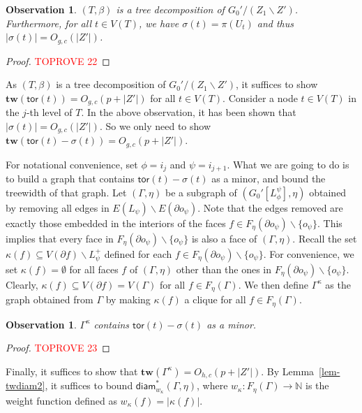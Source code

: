 \documentclass[a4paper,11pt]{article}
\numberwithin{lemma}{section}
\newtheorem{observation}[lemma]{Observation}
\newcommand{\tw}{\mathbf{tw}}
\newcommand{\tor}{\mathsf{tor}}
\begin{document}
\begin{observation} \label{obs-treedecomp}
$(T,\beta)$ is a tree decomposition of $G_0'/(Z_1 \backslash Z')$. Furthermore, for all $t \in V(T)$, we have $\sigma(t) = \pi(U_t)$ and thus $|\sigma(t)| = O_{g,c}(|Z'|)$.
\end{observation}
\begin{proof}\textcolor{red}{TOPROVE 22}\end{proof}

As $(T,\beta)$ is a tree decomposition of $G_0'/(Z_1 \backslash Z')$, it suffices to show $\tw(\tor(t)) = O_{g,c}(p+|Z'|)$ for all $t \in V(T)$.
Consider a node $t \in V(T)$ in the $j$-th level of $T$.
In the above observation, it has been shown that $|\sigma(t)| = O_{g,c}(|Z'|)$.
So we only need to show $\tw(\tor(t) - \sigma(t)) = O_{g,c}(p+|Z'|)$.

For notational convenience, set $\phi = i_j$ and $\psi = i_{j+1}$.
What we are going to do is to build a graph that contains $\tor(t) - \sigma(t)$ as a minor, and bound the treewidth of that graph.
Let $(\varGamma,\eta)$ be a subgraph of $(G_0'[L_\phi^\psi],\eta)$ obtained by removing all edges in $E(L_\psi) \backslash E(\partial o_\psi)$.
Note that the edges removed are exactly those embedded in the interiors of the faces $f \in F_\eta(\partial o_{\psi}) \backslash \{o_{\psi}\}$.
This implies that every face in $F_\eta(\partial o_{\psi}) \backslash \{o_{\psi}\}$ is also a face of $(\varGamma,\eta)$.
Recall the set $\kappa(f) \subseteq V(\partial f) \backslash L_{\psi}^+$ defined for each $f \in F_\eta(\partial o_{\psi}) \backslash \{o_{\psi}\}$.
For convenience, we set $\kappa(f) = \emptyset$ for all faces $f$ of $(\varGamma,\eta)$ other than the ones in $F_\eta(\partial o_{\psi}) \backslash \{o_{\psi}\}$.
Clearly, $\kappa(f) \subseteq V(\partial f) = V(\varGamma)$ for all $f \in F_\eta(\varGamma)$.
We then define $\varGamma^\kappa$ as the graph obtained from $\varGamma$ by making $\kappa(f)$ a clique for all $f \in F_\eta(\varGamma)$.

\begin{observation} \label{obs-kappaminor}
$\varGamma^\kappa$ contains $\tor(t) - \sigma(t)$ as a minor.
\end{observation}
\begin{proof}\textcolor{red}{TOPROVE 23}\end{proof}

Finally, it suffices to show that $\tw(\varGamma^\kappa) = O_{h,c}(p+|Z'|)$.
By Lemma~\ref{lem-twdiam2}, it suffices to bound $\mathsf{diam}_{w_\kappa}^*(\varGamma,\eta)$, where $w_\kappa: F_\eta(\varGamma) \rightarrow \mathbb{N}$ is the weight function defined as $w_\kappa(f) = |\kappa(f)|$.
\end{document}
